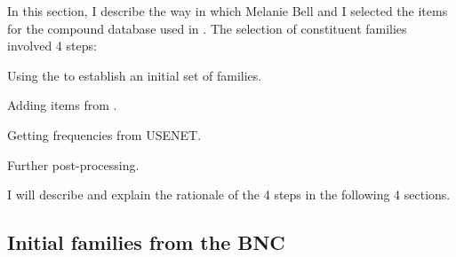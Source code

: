 In this section, I describe the way in which Melanie Bell and I
selected the items for the compound database used in
\citet{BellandSchaefer:2016}. 
The selection of constituent families involved 4 steps:
\begin{inparaenum}[(1)]
\item Using the  to establish an initial set of families.
\item Adding items from .
\item Getting frequencies from USENET.
\item Further post-processing.
\end{inparaenum}
I will describe and explain the rationale of the 4 steps in the
following 4 sections.

\subsection{Initial families from the BNC}
\label{sec:initial}

